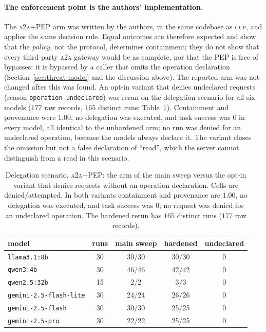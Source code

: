 \documentclass[conference,letterpaper]{IEEEtran}
\newcommand{\gcp}{\textsc{gcp}}
\newcommand{\ata}{\textsc{a2a}}
\begin{document}
\paragraph{The enforcement point is the authors' implementation.} The \ata{}+PEP arm was written by
the authors, in the same codebase as \gcp{}, and applies the same decision rule. Equal outcomes are
therefore expected and show that the \emph{policy}, not the protocol, determines containment; they
do not show that every third-party \ata{} gateway would be as complete, nor that the PEP is free of
bypasses: it is bypassed by a caller that omits the operation declaration (Section~\ref{sec:threat-model}
and the discussion above). The reported arm was not changed after this was found.
An opt-in variant that denies undeclared requests (reason \texttt{operation-undeclared}) was rerun on
the delegation scenario for all six models ($177$ raw records, $165$ distinct runs; Table~\ref{tab:hardened}). Containment and
provenance were $1.00$, no delegation was executed, and task success was $0$ in every model, all
identical to the unhardened arm; no run was denied for an undeclared operation, because the models
always declare it. The variant closes the omission but not a false declaration of ``read'', which the
server cannot distinguish from a read in this scenario.

\begin{table}[H]
\centering
\caption{Delegation scenario, \ata{}+PEP: the arm of the main sweep versus the opt-in variant that denies
requests without an operation declaration. Cells are denied$/$attempted. In both variants containment
and provenance are $1.00$, no delegation was executed, and task success was $0$; no request was denied
for an undeclared operation. The hardened rerun has $165$ distinct runs ($177$ raw records).}
\label{tab:hardened}
\footnotesize
\setlength{\tabcolsep}{3pt}
\begin{tabular}{lcccc}
\toprule
model & runs & main sweep & hardened & undeclared \\
\midrule
\texttt{llama3.1:8b} & 30 & 30/30 & 30/30 & 0 \\
\texttt{qwen3:4b} & 30 & 46/46 & 42/42 & 0 \\
\texttt{qwen2.5:32b} & 15 & 2/2 & 3/3 & 0 \\
\texttt{gemini-2.5-flash-lite} & 30 & 24/24 & 26/26 & 0 \\
\texttt{gemini-2.5-flash} & 30 & 30/30 & 25/25 & 0 \\
\texttt{gemini-2.5-pro} & 30 & 22/22 & 25/25 & 0 \\
\bottomrule
\end{tabular}
\end{table}
\end{document}
